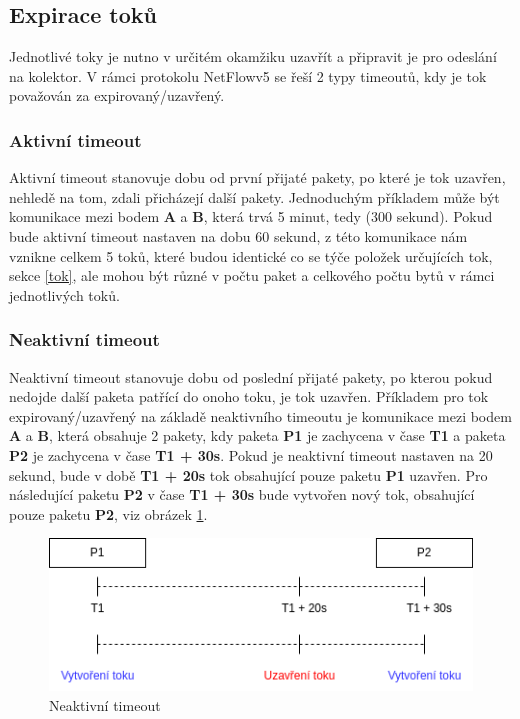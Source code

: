 \documentclass[11pt, a4paper, hidelinks]{article}[08.10.2023]
\begin{document}
    \subsection{Expirace toků}\label{timeout}
    Jednotlivé toky je nutno v určitém okamžiku uzavřít a připravit je pro odeslání na kolektor.  V rámci protokolu NetFlowv5 se řeší 2 typy timeoutů, kdy je tok považován za expirovaný/uzavřený.

    \subsubsection{Aktivní timeout}
    Aktivní timeout stanovuje dobu od první přijaté pakety, po které je tok uzavřen, nehledě na tom, zdali přicházejí další pakety. Jednoduchým příkladem může být komunikace mezi bodem \textbf{A} a \textbf{B}, která trvá 5 minut, tedy (300 sekund). Pokud bude aktivní timeout nastaven na dobu 60 sekund, z této komunikace nám vznikne celkem 5 toků, které budou identické co se týče položek určujících tok, sekce \ref{tok}, ale mohou být různé v počtu paket a celkového počtu bytů v rámci jednotlivých toků.

    \subsubsection{Neaktivní timeout}
    Neaktivní timeout stanovuje dobu od poslední přijaté pakety, po kterou pokud nedojde další paketa patřící do onoho toku, je tok uzavřen. Příkladem pro tok expirovaný/uzavřený na základě neaktivního timeoutu je komunikace mezi bodem \textbf{A} a \textbf{B}, která obsahuje 2 pakety, kdy paketa \textbf{P1} je zachycena v čase \textbf{T1} a paketa \textbf{P2} je zachycena v čase \textbf{T1 + 30s}. Pokud je neaktivní timeout nastaven na 20 sekund, bude v době \textbf{T1 + 20s} tok obsahující pouze paketu \textbf{P1} uzavřen. Pro následující paketu \textbf{P2} v čase \textbf{T1 + 30s} bude vytvořen nový tok, obsahující pouze paketu \textbf{P2}, viz obrázek \ref{neaktivni_timeout}.

    \begin{figure}[H]
        \centering
        \includegraphics[width=0.8\linewidth]{pictures/neaktivni_timeout.png}
        \caption{Neaktivní timeout}
        \label{neaktivni_timeout}
    \end{figure}
    
\end{document}
